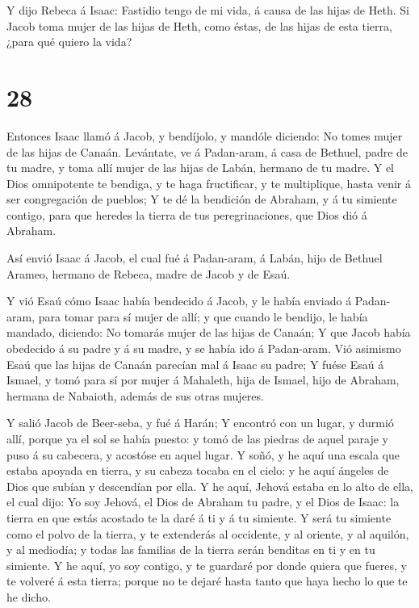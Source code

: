  Y dijo Rebeca á Isaac: Fastidio tengo de mi vida, á causa
de las hijas de Heth. Si Jacob toma mujer de las hijas de Heth, como
éstas, de las hijas de esta tierra, ¿para qué quiero la vida?

\hypertarget{section-27}{%
\section{28}\label{section-27}}

 Entonces Isaac llamó á Jacob, y bendíjolo, y mandóle
diciendo: No tomes mujer de las hijas de Canaán.  Levántate,
ve á Padan-aram, á casa de Bethuel, padre de tu madre, y toma allí mujer
de las hijas de Labán, hermano de tu madre.  Y el Dios
omnipotente te bendiga, y te haga fructificar, y te multiplique, hasta
venir á ser congregación de pueblos;  Y te dé la bendición
de Abraham, y á tu simiente contigo, para que heredes la tierra de tus
peregrinaciones, que Dios dió á Abraham.

 Así envió Isaac á Jacob, el cual fué á Padan-aram, á Labán,
hijo de Bethuel Arameo, hermano de Rebeca, madre de Jacob y de Esaú.

 Y vió Esaú cómo Isaac había bendecido á Jacob, y le había
enviado á Padan-aram, para tomar para sí mujer de allí; y que cuando le
bendijo, le había mandado, diciendo: No tomarás mujer de las hijas de
Canaán;  Y que Jacob había obedecido á su padre y á su
madre, y se había ido á Padan-aram.  Vió asimismo Esaú que
las hijas de Canaán parecían mal á Isaac su padre;  Y fuése
Esaú á Ismael, y tomó para sí por mujer á Mahaleth, hija de Ismael, hijo
de Abraham, hermana de Nabaioth, además de sus otras mujeres.

 Y salió Jacob de Beer-seba, y fué á Harán;  Y
encontró con un lugar, y durmió allí, porque ya el sol se había puesto:
y tomó de las piedras de aquel paraje y puso á su cabecera, y acostóse
en aquel lugar.  Y soñó, y he aquí una escala que estaba
apoyada en tierra, y su cabeza tocaba en el cielo: y he aquí ángeles de
Dios que subían y descendían por ella.  Y he aquí, Jehová
estaba en lo alto de ella, el cual dijo: Yo soy Jehová, el Dios de
Abraham tu padre, y el Dios de Isaac: la tierra en que estás acostado te
la daré á ti y á tu simiente.  Y será tu simiente como el
polvo de la tierra, y te extenderás al occidente, y al oriente, y al
aquilón, y al mediodía; y todas las familias de la tierra serán benditas
en ti y en tu simiente.  Y he aquí, yo soy contigo, y te
guardaré por donde quiera que fueres, y te volveré á esta tierra; porque
no te dejaré hasta tanto que haya hecho lo que te he dicho.

